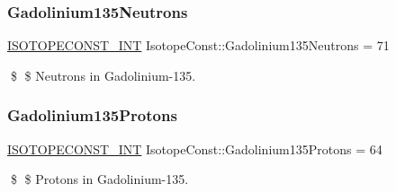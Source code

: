 \subsubsection{\texorpdfstring{Gadolinium135\+Neutrons}{Gadolinium135Neutrons}}
{\footnotesize\ttfamily \mbox{\hyperlink{group___isotope_const-_macros_ga5f18360b3e99483a35c32d789e62621c}{I\+S\+O\+T\+O\+P\+E\+C\+O\+N\+S\+T\+\_\+\+I\+NT}} Isotope\+Const\+::\+Gadolinium135\+Neutrons = 71}

\$ \$ Neutrons in Gadolinium-\/135. \mbox{\label{group___isotope_const-_gadolinium-_gd135_ga6e4139af81b5021a29691bb1646c5c4c}} 
\subsubsection{\texorpdfstring{Gadolinium135\+Protons}{Gadolinium135Protons}}
{\footnotesize\ttfamily \mbox{\hyperlink{group___isotope_const-_macros_ga5f18360b3e99483a35c32d789e62621c}{I\+S\+O\+T\+O\+P\+E\+C\+O\+N\+S\+T\+\_\+\+I\+NT}} Isotope\+Const\+::\+Gadolinium135\+Protons = 64}

\$ \$ Protons in Gadolinium-\/135. 